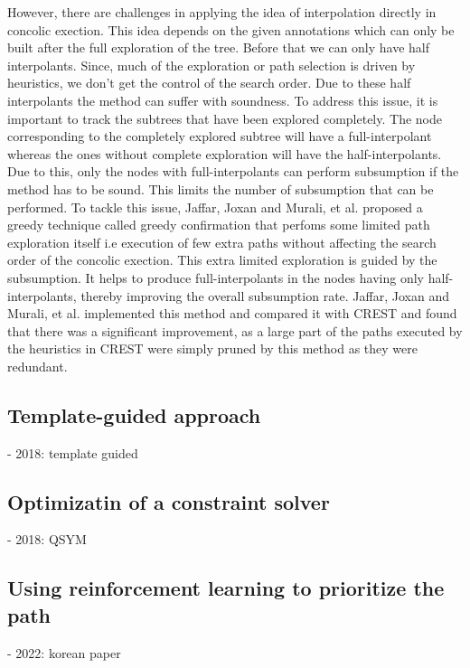 \documentclass[	runningheads,
				a4paper]{llncs}
\begin{document}
However, there are challenges \cite{jaffar2013boosting} in applying the idea of interpolation directly in concolic exection. This idea depends on the given annotations which can only be built after the full exploration of the tree. Before that we can only have half interpolants. Since, much of the exploration or path selection is driven by heuristics, we don't get the control of the search order. Due to these half interpolants the method can suffer with soundness. To address this issue, it is important to track the subtrees that have been explored completely. The node corresponding to the completely explored subtree will have a full-interpolant whereas the ones without complete exploration will have the half-interpolants. Due to this, only the nodes with full-interpolants can perform subsumption if the method has to be sound. This limits the number of subsumption that can be performed. To tackle this issue, Jaffar, Joxan and Murali, et al. \cite{jaffar2013boosting} proposed a greedy technique called greedy confirmation that perfoms some limited path exploration itself i.e execution of few extra paths without affecting the search order of the concolic exection. This extra limited exploration is guided by the subsumption. It helps to produce full-interpolants in the nodes having only half-interpolants, thereby improving the overall subsumption rate. Jaffar, Joxan and Murali, et al. \cite{jaffar2013boosting} implemented this method and compared it with CREST
\cite{kousik2008heuristic} and found that there was a significant improvement, as a large part of the paths executed by the heuristics in CREST were simply pruned by this method as they were redundant.


\subsection{Template-guided approach}
- 2018: template guided


\subsection{Optimizatin of a constraint solver}
- 2018: QSYM


\subsection{Using reinforcement learning to prioritize the path}
- 2022: korean paper
\end{document}
